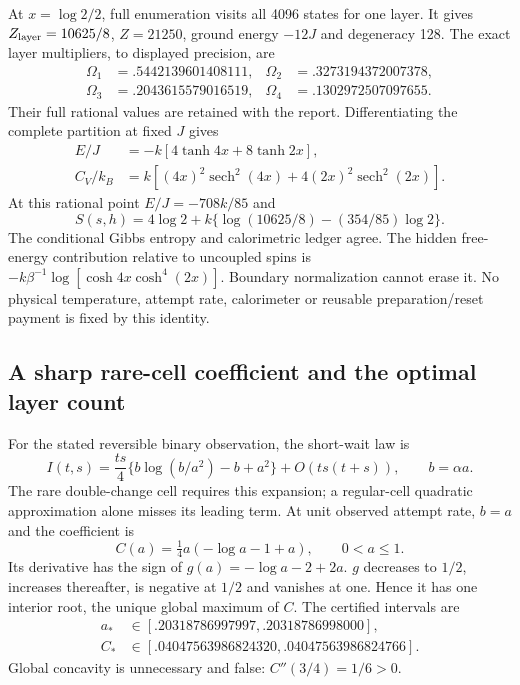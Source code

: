 At $x=\log2/2$, full enumeration visits all 4096 states for one layer.
It gives $Z_{\rm layer}=10625/8$, $Z=21250$, ground energy $-12J$ and
degeneracy 128. The exact layer multipliers, to displayed precision, are
\begin{equation}
\begin{aligned}
 \Omega_1&=.5442139601408111,&\Omega_2&=.3273194372007378,\\
 \Omega_3&=.2043615579016519,&\Omega_4&=.1302972507097655.
\end{aligned}
\end{equation}
Their full rational values are retained with the report. Differentiating
the complete partition at fixed $J$ gives
\begin{align}
 E/J&=-k[4\tanh4x+8\tanh2x],\\
 C_V/k_B&=k[(4x)^2\operatorname{sech}^2(4x)
                     +4(2x)^2\operatorname{sech}^2(2x)].
\end{align}
At this rational point $E/J=-708k/85$ and
\begin{equation}
 S(s,h)=4\log2+k\{\log(10625/8)-(354/85)\log2\}.
\end{equation}
The conditional Gibbs entropy and calorimetric ledger agree. The hidden
free-energy contribution relative to uncoupled spins is
$-k\beta^{-1}\log[\cosh4x\cosh^4(2x)]$. Boundary normalization cannot
erase it. No physical temperature, attempt rate, calorimeter or reusable
preparation/reset payment is fixed by this identity.

\subsection{A sharp rare-cell coefficient and the optimal layer count}
\label{sec:rare-cell-12}

For the stated reversible binary observation, the short-wait law is
\begin{equation}
 I(t,s)=\frac{ts}{4}\{b\log(b/a^2)-b+a^2\}
                 +O(ts(t+s)),\qquad b=\alpha a.
\end{equation}
The rare double-change cell requires this expansion; a regular-cell
quadratic approximation alone misses its leading term. At unit observed
attempt rate, $b=a$ and the coefficient is
\begin{equation}
 C(a)=\tfrac14a(-\log a-1+a),\qquad0<a\le1.
\end{equation}
Its derivative has the sign of $g(a)=-\log a-2+2a$.
$g$ decreases to $1/2$, increases thereafter, is negative at $1/2$ and
vanishes at one. Hence it has one interior root, the unique global maximum
of $C$. The certified intervals are
\begin{align*}
 a_*&\in[.20318786997997,.20318786998000],\\
 C_*&\in[.04047563986824320,.04047563986824766].
\end{align*}
Global concavity is unnecessary and false: $C''(3/4)=1/6>0$.

